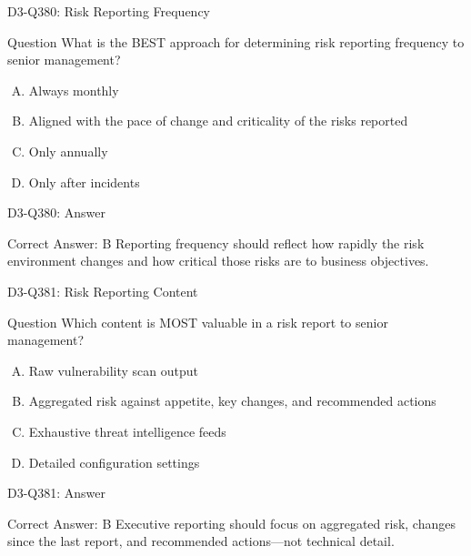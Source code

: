 \documentclass{beamer}
\begin{document}
\begin{frame}{D3-Q380: Risk Reporting Frequency}
	\begin{block}{Question}
		What is the BEST approach for determining risk reporting frequency to senior management?
	\end{block}
	\begin{enumerate}[(A)]
		\item Always monthly
		\item Aligned with the pace of change and criticality of the risks reported
		\item Only annually
		\item Only after incidents
	\end{enumerate}
\end{frame}
\begin{frame}{D3-Q380: Answer}
	\begin{block}{Correct Answer: B}
		Reporting frequency should reflect how rapidly the risk environment changes and how critical those risks are to business objectives.
	\end{block}
\end{frame}

\begin{frame}{D3-Q381: Risk Reporting Content}
	\begin{block}{Question}
		Which content is MOST valuable in a risk report to senior management?
	\end{block}
	\begin{enumerate}[(A)]
		\item Raw vulnerability scan output
		\item Aggregated risk against appetite, key changes, and recommended actions
		\item Exhaustive threat intelligence feeds
		\item Detailed configuration settings
	\end{enumerate}
\end{frame}
\begin{frame}{D3-Q381: Answer}
	\begin{block}{Correct Answer: B}
		Executive reporting should focus on aggregated risk, changes since the last report, and recommended actions—not technical detail.
	\end{block}
\end{frame}
\end{document}
